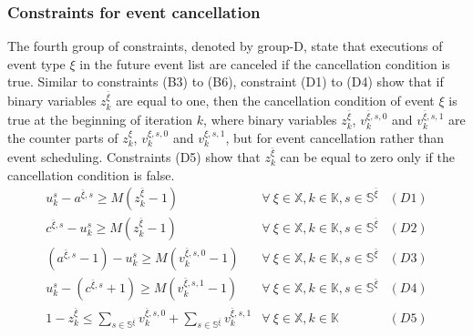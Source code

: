 \documentclass[suppldata]{interact}
\theoremstyle{plain}
\theoremstyle{definition}
\theoremstyle{remark}
\begin{document}
\subsubsection{Constraints for event cancellation}\label{sec:const_D}
The fourth group of constraints, denoted by group-D, state that executions of event type ${\xi}$ in the future event list are canceled if the cancellation condition is true. Similar to constraints (B3) to (B6), constraint (D1) to (D4) show that if binary variables $z^{\bar{\xi}}_{k}$ are equal to one, then the cancellation condition of event ${\xi}$ is true at the beginning of iteration $k$, where binary variables $z^{\bar{\xi}}_{k}$, $v^{\bar{\xi},s,0}_k$ and $v^{\bar{\xi},s,1}_k$ are the counter parts of $z^{\xi}_{k}$, $v^{\xi,s,0}_k$ and $v^{\xi,s,1}_k$, but for event cancellation rather than event scheduling. %
Constraints (D5) show that $z^{\bar{\xi}}_{k}$ can be equal to zero only if the cancellation condition is false. 
\begin{eqnarray}
	u^s_k - a^{\bar{\xi},s} \ge M(z^{\bar{\xi}}_{k}-1)&\forall\ \xi\in \mathbb{X},k\in \mathbb{K},s\in \mathbb{S}^{\bar{\xi}}&(D1)\nonumber\\
	c^{\bar{\xi},s} - u^s_k \ge M(z^{\bar{\xi}}_{k}-1)&\forall\ \xi\in \mathbb{X},k\in \mathbb{K},s\in \mathbb{S}^{\bar{\xi}}&(D2)\nonumber\\
	( a^{\bar{\xi},s}-1) - u^s_k \ge M(v^{\bar{\xi},s,0}_k-1) & \forall\ \xi\in \mathbb{X},k\in \mathbb{K},s\in \mathbb{S}^{\bar{\xi}} &(D3)\nonumber\\
	u^s_k -  (c^{\bar{\xi},s}+1) \ge M(v^{\bar{\xi},s,1}_k-1) & \forall\ \xi\in \mathbb{X},k\in \mathbb{K},s\in \mathbb{S}^{\bar{\xi}} &(D4)\nonumber\\
	1 - z^{\bar{\xi}}_{k} \le \sum_{s\in \mathbb{S}^{\bar{\xi}}} v^{\bar{\xi},s,0}_k + \sum_{s\in \mathbb{S}^{\bar{\xi}}} v^{\bar{\xi},s,1}_k&\forall\ \xi\in \mathbb{X},k\in \mathbb{K}&(D5)\nonumber
\end{eqnarray}
\end{document}
